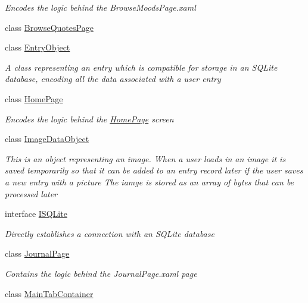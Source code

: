 \begin{DoxyCompactItemize}
\begin{DoxyCompactList}\small\item\em Encodes the logic behind the Browse\+Moods\+Page.\+xaml \end{DoxyCompactList}\item 
class \hyperlink{class_intention_journal_1_1_browse_quotes_page}{Browse\+Quotes\+Page}
\item 
class \hyperlink{class_intention_journal_1_1_entry_object}{Entry\+Object}
\begin{DoxyCompactList}\small\item\em A class representing an entry which is compatible for storage in an S\+Q\+Lite database, encoding all the data associated with a user entry \end{DoxyCompactList}\item 
class \hyperlink{class_intention_journal_1_1_home_page}{Home\+Page}
\begin{DoxyCompactList}\small\item\em Encodes the logic behind the \hyperlink{class_intention_journal_1_1_home_page}{Home\+Page} screen \end{DoxyCompactList}\item 
class \hyperlink{class_intention_journal_1_1_image_data_object}{Image\+Data\+Object}
\begin{DoxyCompactList}\small\item\em This is an object representing an image. When a user loads in an image it is saved temporarily so that it can be added to an entry record later if the user saves a new entry with a picture The iamge is stored as an array of bytes that can be processed later \end{DoxyCompactList}\item 
interface \hyperlink{interface_intention_journal_1_1_i_s_q_lite}{I\+S\+Q\+Lite}
\begin{DoxyCompactList}\small\item\em Directly establishes a connection with an S\+Q\+Lite database \end{DoxyCompactList}\item 
class \hyperlink{class_intention_journal_1_1_journal_page}{Journal\+Page}
\begin{DoxyCompactList}\small\item\em Contains the logic behind the Journal\+Page.\+xaml page \end{DoxyCompactList}\item 
class \hyperlink{class_intention_journal_1_1_main_tab_container}{Main\+Tab\+Container}

\end{DoxyCompactItemize}
